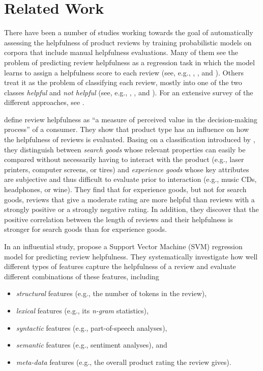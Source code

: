 \documentclass[
    a4paper,%
    12pt,%
    oneside,%
    toc=bibliography,
    final,
]{scrartcl}
\begin{document}
\section{Related Work}
\label{sec:related-work}

There have been a number of studies working towards the goal of automatically assessing the helpfulness of product reviews by training probabilistic models on corpora that include manual helpfulness evaluations. Many of them see the problem of predicting review helpfulness as a regression task in which the model learns to assign a helpfulness score to each review (see, e.g., \citealt{Kim2006}, \citealt{ZhangVaradarajan2006}, and \citealt{SieringMuntermann2013}). Others treat it as the problem of classifying each review, mostly into one of the two classes \textit{helpful} and \textit{not helpful} (see, e.g., \citealt{ChenTseng2011}, \citealt{Mertz2014}, and \citealt{Zhang2015}). For an extensive survey of the different approaches, see \citet{Almagrabi2015}.

\citet[186]{MudambiSchuff2010} define review helpfulness as “a measure of perceived value in the decision-making process” of a consumer. They show that product type has an influence on how the helpfulness of reviews is evaluated. Basing on a classification introduced by \citet{Nelson1970}, they distinguish between \textit{search goods} whose relevant properties can easily be compared without necessarily having to interact with the product (e.g., laser printers, computer screens, or tires) and \textit{experience goods} whose key attributes are subjective and thus difficult to evaluate prior to interaction (e.g., music CDs, headphones, or wine). They find that for experience goods, but not for search goods, reviews that give a moderate rating are more helpful than reviews with a strongly positive or a strongly negative rating. In addition, they discover that the positive correlation between the length of reviews and their helpfulness is stronger for search goods than for experience goods.

In an influential study, \citet{Kim2006} propose a Support Vector Machine (SVM) regression model for predicting review helpfulness. They systematically investigate how well different types of features capture the helpfulness of a review and evaluate different combinations of these features, including

\begin{itemize}
\item \textit{structural} features (e.g., the number of tokens in the review),
\item \textit{lexical} features (e.g., its \textit{n-gram} statistics),
\item \textit{syntactic} features (e.g., part-of-speech analyses),
\item \textit{semantic} features (e.g., sentiment analyses), and
\item \textit{meta-data} features (e.g., the overall product rating the review gives).
\end{itemize}
\end{document}
